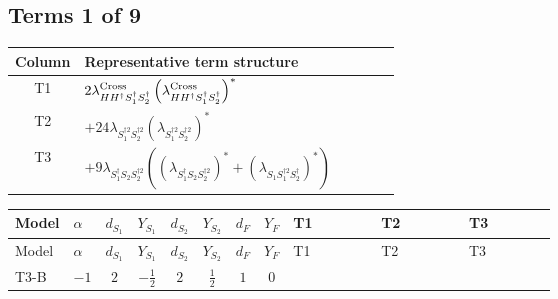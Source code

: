 \documentclass[8pt]{article}
\begin{document}
\begin{landscape}
\subsection*{Terms 1 of 9}
\begin{center}
\begin{tabular}{@{}c >{\raggedright\arraybackslash}p{0.82\linewidth}@{}}
\toprule
Column & Representative term structure \\
\midrule
T1 & \(\displaystyle 2 {\lambda_{H H^\dagger S_1^\dagger S_2^\dagger}^{\rm Cross}} \left({\lambda_{H H^\dagger S_1^\dagger S_2^\dagger}^{\rm Cross}}\right)^{*}\) \\
\midrule
T2 & \(\displaystyle +24 {\lambda_{S_1^{\dagger 2}S_2^{\dagger 2}}} \left({\lambda_{S_1^{\dagger 2}S_2^{\dagger 2}}}\right)^{*}\) \\
\midrule
T3 & \(\displaystyle +9 {\lambda_{S_1^\dagger S_2 S_2^{\dagger 2}}} (\left({\lambda_{S_1^\dagger S_2 S_2^{\dagger 2}}}\right)^{*}+\left({\lambda_{S_1 S_1^{\dagger 2}S_2^\dagger}}\right)^{*})\) \\
\midrule
\bottomrule
\end{tabular}
\end{center}
\smallskip
\tiny
\begin{longtable}{@{}llcccccc >{\raggedright\arraybackslash}p{0.21\linewidth} >{\raggedright\arraybackslash}p{0.21\linewidth} >{\raggedright\arraybackslash}p{0.21\linewidth}@{}}
\toprule
Model & $\alpha$ & $d_{S_1}$ & $Y_{S_1}$ & $d_{S_2}$ & $Y_{S_2}$ & $d_F$ & $Y_F$ & T1 & T2 & T3 \\
\midrule
\endfirsthead
\toprule
Model & $\alpha$ & $d_{S_1}$ & $Y_{S_1}$ & $d_{S_2}$ & $Y_{S_2}$ & $d_F$ & $Y_F$ & T1 & T2 & T3 \\
\midrule
\endhead
T3-B & $-1$ & $2$ & $-\frac{1}{2}$ & $2$ & $\frac{1}{2}$ & $1$ & $0$ & \scriptsize\adjustbox{max width=\linewidth}{$\begin{gathered} 2 {\lambda_{H H^\dagger S_1^\dagger S_2^\dagger}^{\rm Cross}} \left({\lambda_{H H^\dagger S_1^\dagger S_2^\dagger}^{\rm Cross}}\right)^{*}\end{gathered}$} & \scriptsize\adjustbox{max width=\linewidth}{$\begin{gathered} +24 {\lambda_{S_1^{\dagger 2}S_2^{\dagger 2}}} \left({\lambda_{S_1^{\dagger 2}S_2^{\dagger 2}}}\right)^{*}\end{gathered}$} & \scriptsize\adjustbox{max width=\linewidth}{$\begin{gathered} +9 {\lambda_{S_1^\dagger S_2 S_2^{\dagger 2}}} (\left({\lambda_{S_1^\dagger S_2 S_2^{\dagger 2}}}\right)^{*}+\left({\lambda_{S_1 S_1^{\dagger 2}S_2^\dagger}}\right)^{*})\end{gathered}$} \\

\end{longtable}
\end{landscape}
\end{document}
